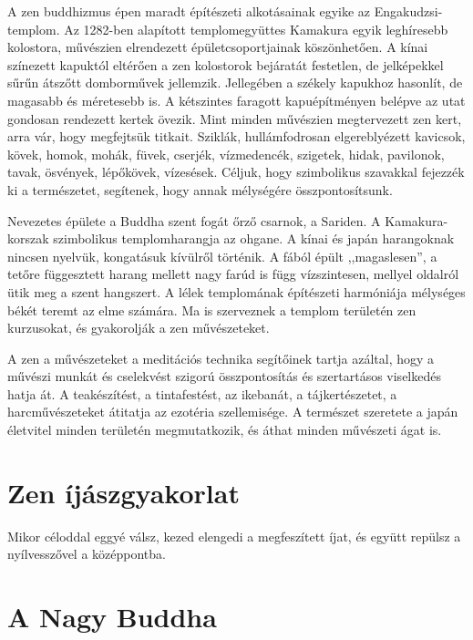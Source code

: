 A zen buddhizmus épen maradt építészeti alkotásainak egyike az
Engakudzsi-templom. Az 1282-ben alapított templomegyüttes Kamakura
egyik leghíresebb kolostora, művészien elrendezett épületcsoportjainak
köszönhetően. A kínai színezett kapuktól eltérően a zen
kolostorok bejáratát festetlen, de jelképekkel sűrűn átszőtt domborművek
jellemzik. Jellegében a székely kapukhoz hasonlít, de magasabb
és méretesebb is. A kétszintes faragott kapuépítményen belépve az utat
gondosan rendezett kertek övezik. Mint minden művészien megtervezett
zen kert, arra vár, hogy megfejtsük titkait. Sziklák, hullámfodrosan
elgereblyézett kavicsok, kövek, homok, mohák, füvek, cserjék,
vízmedencék, szigetek, hidak, pavilonok, tavak, ösvények, lépőkövek,
vízesések. Céljuk, hogy szimbolikus szavakkal fejezzék ki a természetet,
segítenek, hogy annak mélységére összpontosítsunk.

Nevezetes épülete a Buddha szent fogát őrző csarnok, a Sariden.
A Kamakura-korszak szimbolikus templomharangja az ohgane. A kínai
és japán harangoknak nincsen nyelvük, kongatásuk kívülről történik.
A fából épült ,,magaslesen'', a tetőre függesztett harang mellett
nagy farúd is függ vízszintesen, mellyel oldalról ütik meg a szent
hangszert. A lélek templomának építészeti harmóniája mélységes békét
teremt az elme számára. Ma is szerveznek a templom területén zen
kurzusokat, és gyakorolják a zen művészeteket.

A zen a művészeteket a meditációs technika segítőinek tartja azáltal,
hogy a művészi munkát és cselekvést szigorú összpontosítás és
szertartásos viselkedés hatja át. A teakészítést, a tintafestést, az
ikebanát, a tájkertészetet, a harcművészeteket átitatja az ezotéria
szellemisége. A természet szeretete a japán életvitel minden területén
megmutatkozik, és áthat minden művészeti ágat is.

\section{Zen íjászgyakorlat}

\begin{itshape}
Mikor céloddal eggyé válsz, kezed elengedi a megfeszített íjat, és együtt
repülsz a nyílvesszővel a középpontba.
\end{itshape}

\section{A Nagy Buddha}

